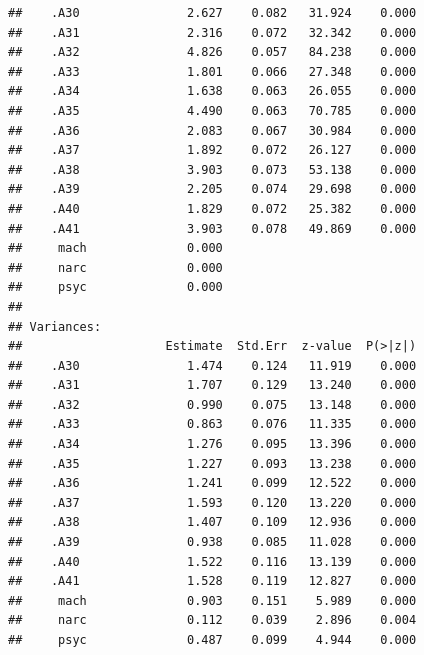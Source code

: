\documentclass[
  english,
  man]{apa6}
\begin{document}
\begin{verbatim}
##    .A30               2.627    0.082   31.924    0.000
##    .A31               2.316    0.072   32.342    0.000
##    .A32               4.826    0.057   84.238    0.000
##    .A33               1.801    0.066   27.348    0.000
##    .A34               1.638    0.063   26.055    0.000
##    .A35               4.490    0.063   70.785    0.000
##    .A36               2.083    0.067   30.984    0.000
##    .A37               1.892    0.072   26.127    0.000
##    .A38               3.903    0.073   53.138    0.000
##    .A39               2.205    0.074   29.698    0.000
##    .A40               1.829    0.072   25.382    0.000
##    .A41               3.903    0.078   49.869    0.000
##     mach              0.000                           
##     narc              0.000                           
##     psyc              0.000                           
## 
## Variances:
##                    Estimate  Std.Err  z-value  P(>|z|)
##    .A30               1.474    0.124   11.919    0.000
##    .A31               1.707    0.129   13.240    0.000
##    .A32               0.990    0.075   13.148    0.000
##    .A33               0.863    0.076   11.335    0.000
##    .A34               1.276    0.095   13.396    0.000
##    .A35               1.227    0.093   13.238    0.000
##    .A36               1.241    0.099   12.522    0.000
##    .A37               1.593    0.120   13.220    0.000
##    .A38               1.407    0.109   12.936    0.000
##    .A39               0.938    0.085   11.028    0.000
##    .A40               1.522    0.116   13.139    0.000
##    .A41               1.528    0.119   12.827    0.000
##     mach              0.903    0.151    5.989    0.000
##     narc              0.112    0.039    2.896    0.004
##     psyc              0.487    0.099    4.944    0.000
\end{verbatim}
\end{document}
